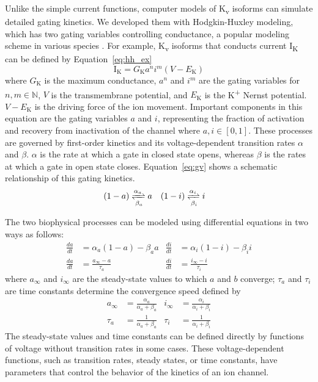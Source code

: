 \documentclass[11pt]{article}
\begin{document}
Unlike the simple current functions, computer models of K\textsubscript{v} isoforms can simulate detailed gating kinetics. We developed them with Hodgkin-Huxley modeling, which has two gating variables controlling conductance, a popular modeling scheme in various species \citep{ten2004model,mahajan2008rabbit}. For example, K\textsubscript{v} isoforms that conducts current I\textsubscript{K} can be defined by Equation~\ref{eq:hh_ex}
\begin{equation}
    \label{eq:hh_ex}
    \mathrm{I}_{\mathrm{K}} = G_{\mathrm{K}}a^{n}i^{m}(V-E_{\mathrm{K}})
\end{equation}
where $G_{\mathrm{K}}$ is the maximum conductance, $a^{n}$ and $i^{m}$ are the gating variables for $n,m \in \mathbb{N}$, $V$ is the transmembrane potential, and $E_{\mathrm{K}}$ is the K\textsuperscript{+} Nernst potential. $V-E_{\mathrm{K}}$ is the driving force of the ion movement. Important components in this equation are the gating variables $a$ and $i$, representing the fraction of activation and recovery from inactivation of the channel where $a,i \in [0,1]$. These processes are governed by first-order kinetics and its voltage-dependent transition rates $\alpha$ and $\beta$. $\alpha$ is the rate at which a gate in closed state opens, whereas $\beta$ is the rates at which a gate in open state closes. Equation~\ref{eq:gv} shows a schematic relationship of this gating kinetics.
\begin{align}
    \label{eq:gv}
    (1-a)&\xrightleftharpoons[\beta_{a}]{\alpha_{a}}a & (1-i)&\xrightleftharpoons[\beta_{i}]{\alpha_{i}}i
\end{align}

The two biophysical processes can be modeled using differential equations in two ways as follows:
\begin{align}
    \frac{da}{dt} &=\alpha_{a}(1-a)-\beta_{a}a   &\frac{di}{dt} &=\alpha_{i}(1-i)-\beta_{i}i \\
    \frac{da}{dt} &= \frac{a_{\infty}-a}{\tau_{a}}  &\frac{di}{dt} &= \frac{i_{\infty}-i}{\tau_{i}}
\end{align}
where $a_{\infty}$ and $i_{\infty}$ are the steady-state values to which $a$ and $b$ converge; $\tau_{a}$ and $\tau_{i}$ are time constants determine the convergence speed defined by
\begin{align}
    a_{\infty} &= \frac{\alpha_{a}}{\alpha_{a}+\beta_{a}} & i_{\infty} &=  \frac{\alpha_{i}}{\alpha_{i}+\beta_{i}} \\
    \tau_{a} &= \frac{1}{\alpha_{a}+\beta_{a}} & \tau_{i} &= \frac{1}{\alpha_{i}+\beta_{i}}
\end{align}
The steady-state values and time constants can be defined directly by functions of voltage without transition rates in some cases. These voltage-dependent functions, such as transition rates, steady states, or time constants, have parameters that control the behavior of the kinetics of an ion channel.
\end{document}
